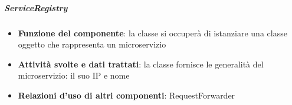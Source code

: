 \subparagraph{ServiceRegistry}
\begin{itemize}
	\item \textbf{Funzione del componente}: la classe si occuper\`{a} di istanziare una classe oggetto che rappresenta un microservizio
	\item \textbf{Attivit\`{a} svolte e dati trattati}: la classe fornisce le generalit\`{a} del microservizio: il suo IP e nome
	\item \textbf{Relazioni d'uso di altri componenti}: RequestForwarder
\end{itemize}





